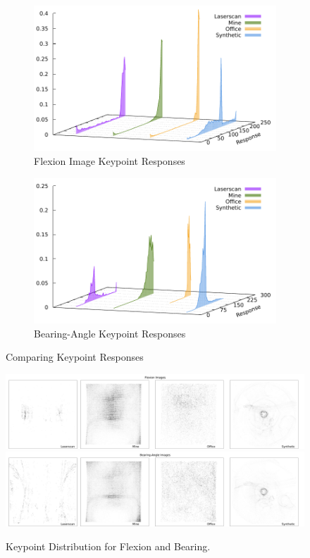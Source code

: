 \begin{figure}[H]
\begin{subfigure}[t]{0.45\linewidth}
    \includegraphics[width=\linewidth]{chapter06/results/ORB/flexion/response.pdf}%
    \caption{Flexion Image Keypoint Responses}
\end{subfigure}\quad
\begin{subfigure}[t]{0.45\linewidth}
    \includegraphics[width=\linewidth]{chapter06/results/ORB/bearing/response.pdf}
    \caption{Bearing-Angle Keypoint Responses}
\end{subfigure}
    \caption{Comparing Keypoint Responses}
\end{figure}
\begin{figure}[H]
    \includegraphics[width=\linewidth]{chapter06/results/ORB/flexion/distribution.pdf}\\
    \includegraphics[width=\linewidth]{chapter06/results/ORB/bearing/distribution.pdf}%
    \caption{Keypoint Distribution for Flexion and Bearing.}
\end{figure}
